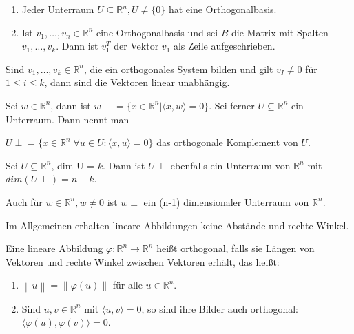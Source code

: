 \documentclass{mg2}
\begin{document}
\begin{satz}[Orthogonalbasis]
\begin{enumerate}
\item Jeder Unterraum $U \subseteq \mathbb{R}^n, U \neq \{0\}$ hat eine Orthogonalbasis.
\item Ist $v_1, \dots, v_n \in \mathbb{R}^n$ eine Orthogonalbasis und sei $B$ die Matrix mit Spalten $v_1, \dots, v_k$. Dann ist $v_1^T$ der Vektor $v_1$ als Zeile aufgeschrieben.
\end{enumerate}
\end{satz}

\begin{proposition}
Sind $v_1, \dots, v_k \in \mathbb{R}^n$, die ein orthogonales System bilden und gilt $v_I \neq 0$ für $1 \leq i \leq k$, dann sind die Vektoren linear unabhängig.
\end{proposition}

\begin{definition}
Sei $w \in \mathbb{R}^n$, dann  ist $w \perp = \{x \in \mathbb{R}^n |  \langle x,w \rangle  = 0 \}$. Sei ferner $U \subseteq \mathbb{R}^n$ ein Unterraum. Dann nennt man 

$U \perp = \{ x \in \mathbb{R}^n | \forall u \in U: \langle x,u \rangle = 0 \}$ das \underline{orthogonale Komplement} von $U$.
\end{definition}

\begin{satz}
Sei $U \subseteq \mathbb{R}^n$, dim U = $k$. Dann ist $U \perp$ ebenfalls ein Unterraum von $\mathbb{R}^n$ mit $dim(U \perp) = n-k$.

Auch für $w \in \mathbb{R}^n, w \neq 0$ ist $w \perp$ ein (n-1) dimensionaler Unterraum von $\mathbb{R}^n$.
\end{satz}

\begin{beobachtung}
Im Allgemeinen erhalten lineare Abbildungen keine Abstände und rechte Winkel.
\end{beobachtung}

\begin{definition}
Eine lineare Abbildung $\varphi: \mathbb{R}^n \to \mathbb{R}^n$ heißt \underline{orthogonal}, falls sie Längen von Vektoren und rechte Winkel zwischen Vektoren erhält, das heißt:
\begin{enumerate}
\item $\left\| u \right\| = \left\| \varphi(u) \right\|$ für alle $u \in \mathbb{R}^n$.
\item Sind $u, v \in \mathbb{R}^n$ mit $\langle u,v \rangle = 0$, so sind ihre Bilder auch orthogonal: $\langle \varphi(u), \varphi(v) \rangle = 0$.
\end{enumerate}
\end{definition}
\end{document}
